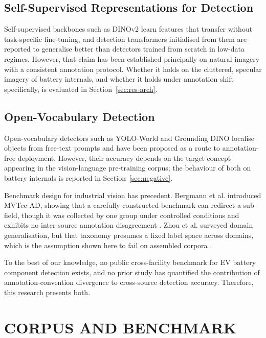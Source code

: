 \subsection{Self-Supervised Representations for Detection}

\noindent Self-supervised backbones such as DINOv2 \cite{dinov2} learn features
that transfer without task-specific fine-tuning, and detection transformers
\cite{carion2020detr} initialised from them \cite{rfdetr} are reported to generalise better than
detectors trained from scratch in low-data regimes. However, that claim has been
established principally on natural imagery with a consistent annotation
protocol. Whether it holds on the cluttered, specular imagery of battery
internals, and whether it holds under annotation shift specifically, is evaluated
in Section~\ref{sec:res-arch}.

\subsection{Open-Vocabulary Detection}

\noindent Open-vocabulary detectors such as YOLO-World \cite{yoloworld} and Grounding
DINO \cite{groundingdino} localise objects from free-text prompts and have been
proposed as a route to annotation-free deployment. However, their accuracy depends on
the target concept appearing in the vision-language pre-training corpus; the behaviour
of both on battery internals is reported in Section~\ref{sec:negative}.

Benchmark design for industrial vision has precedent. Bergmann et al. introduced
MVTec AD, showing that a carefully constructed benchmark can redirect a sub-field,
though it was collected by one group under controlled conditions and exhibits no
inter-source annotation disagreement \cite{bergmann2019mvtec}. Zhou et al. surveyed domain
generalisation, but that taxonomy presumes a fixed label space across domains, which is
the assumption shown here to fail on assembled corpora \cite{zhou2022dg}.

To the best of our knowledge, no public cross-facility benchmark for EV battery
component detection exists, and no prior study has quantified the contribution of
annotation-convention divergence to cross-source detection accuracy. Therefore,
this research presents both.

\section{\uppercase{Corpus and Benchmark}}
\label{sec:data}

